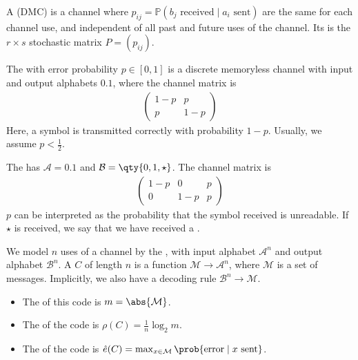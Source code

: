 \begin{definition}
    A  (DMC) is a channel where $p_{ij} = \mathbb{P}(b_j \text{ received} \mid a_i \text{ sent})$ are the same for each channel use, and independent of all past and future uses of the channel.
    Its  is the $r \times s$ stochastic matrix $P = (p_{ij})$.
\end{definition}

\begin{example}
    The  with error probability $p \in [0,1]$ is a discrete memoryless channel with input and output alphabets $\qty{0, 1}$, where the channel matrix is
    \begin{align*}
        \begin{pmatrix}
            1-p & p \\
            p & 1-p
    \end{pmatrix}
    \end{align*}
    Here, a symbol is transmitted correctly with probability $1 - p$.
    Usually, we assume $p < \frac{1}{2}$.
\end{example}

\begin{example}
    The  has $\mathcal A = \qty{0, 1}$ and $\mathcal B = \qty{0, 1, \star}$.
    The channel matrix is
    \begin{align*}
        \begin{pmatrix}
        1-p & 0 & p \\
        0 & 1-p & p
    \end{pmatrix}
    \end{align*}
    $p$ can be interpreted as the probability that the symbol received is unreadable.
    If $\star$ is received, we say that we have received a .
\end{example}

\begin{definition}
    We model $n$ uses of a channel by the , with input alphabet $\mathcal A^n$ and output alphabet $\mathcal B^n$.
    A  $C$ of length $n$ is a function $\mathcal M \to \mathcal A^n$, where $\mathcal M$ is a set of messages.
    Implicitly, we also have a decoding rule $\mathcal B^n \to \mathcal M$.
    \begin{itemize}
        \item The  of this code is $m = \abs{\mathcal M}$.
        \item The  of the code is $\rho(C) = \frac{1}{n} \log_2 m$.
        \item The  of the code is $\hat e(C) = \max_{x \in \mathcal M} \prob{\text{error} \mid x \text{ sent}}$.
    \end{itemize}
\end{definition}

